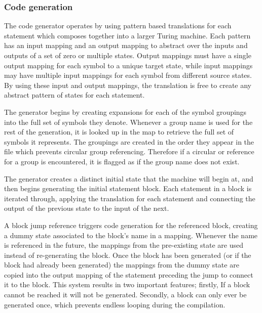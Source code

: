 \documentclass[11pt]{article}
\begin{document}
\subsubsection{Code generation}

The code generator operates by using pattern based translations for each statement which composes together into a larger Turing machine. Each pattern has an input mapping and an output mapping to abstract over the inputs and outputs of a set of zero or multiple states. Output mappings must have a single output mapping for each symbol to a unique target state, while input mappings may have multiple input mappings for each symbol from different source states. By using these input and output mappings, the translation is free to create any abstract pattern of states for each statement.

The generator begins by creating expansions for each of the symbol groupings into the full set of symbols they denote. Whenever a group name is used for the rest of the generation, it is looked up in the map to retrieve the full set of symbols it represents. The groupings are created in the order they appear in the file which prevents circular group referencing. Therefore if a circular or reference for a group is encountered, it is flagged as if the group name does not exist.

The generator creates a distinct initial state that the machine will begin at, and then begins generating the initial statement block. Each statement in a block is iterated through, applying the translation for each statement and connecting the output of the previous state to the input of the next.

A block jump reference triggers code generation for the referenced block, creating a dummy state associated to the block's name in a mapping. Whenever the name is referenced in the future, the mappings from the pre-existing state are used instead of re-generating the block. Once the block has been generated (or if the block had already been generated) the mappings from the dummy state are copied into the output mapping of the statement preceding the jump to connect it to the block. This system results in two important features; firstly, If a block cannot be reached it will not be generated. Secondly, a block can only ever be generated once, which prevents endless looping during the compilation.
\end{document}
